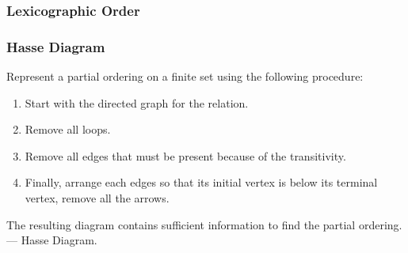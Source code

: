 \subsubsection{Lexicographic Order}
\subsubsection{Hasse Diagram}
Represent a partial ordering on a finite set using the following procedure: 
\begin{enumerate}
    \item Start with the directed graph for the relation. 
    \item Remove all loops. 
    \item Remove all edges that must be present because of the transitivity. 
    \item Finally, arrange each edges so that its initial vertex is  below its terminal vertex, remove all the arrows. 
\end{enumerate}
The resulting diagram contains sufficient information to find the partial ordering. --- Hasse Diagram. 

